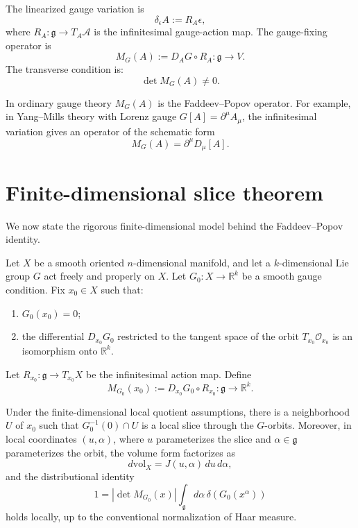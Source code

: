 \documentclass[11pt]{article}
\newcommand{\A}{\mathcal A}
\newcommand{\gh}{\mathfrak g}
\newcommand{\vol}{\mathrm{vol}}
\begin{document}
The linearized gauge variation is
\[
\delta_\epsilon A := R_A\epsilon,
\]
where \(R_A:\gh\to T_A\A\) is the infinitesimal gauge-action map. The gauge-fixing operator is
\[
M_G(A):=D_A G\circ R_A:\gh\to V.
\]
The transverse condition is:
\[
\det M_G(A)\ne0.
\]

\begin{remark}
In ordinary gauge theory \(M_G(A)\) is the Faddeev--Popov operator. For example, in Yang--Mills theory with Lorenz gauge \(G[A]=\partial^\mu A_\mu\), the infinitesimal variation gives an operator of the schematic form
\[
M_G(A)=\partial^\mu D_\mu[A].
\]
\end{remark}

\section{Finite-dimensional slice theorem}

We now state the rigorous finite-dimensional model behind the Faddeev--Popov identity.

\begin{assumption}
Let \(X\) be a smooth oriented \(n\)-dimensional manifold, and let a \(k\)-dimensional Lie group \(G\) act freely and properly on \(X\). Let \(G_0:X\to\mathbb R^k\) be a smooth gauge condition. Fix \(x_0\in X\) such that:
\begin{enumerate}
\item \(G_0(x_0)=0\);
\item the differential \(D_{x_0}G_0\) restricted to the tangent space of the orbit \(T_{x_0}\mathcal O_{x_0}\) is an isomorphism onto \(\mathbb R^k\).
\end{enumerate}
\end{assumption}

Let \(R_{x_0}:\mathfrak g\to T_{x_0}X\) be the infinitesimal action map. Define
\[
M_{G_0}(x_0):=D_{x_0}G_0\circ R_{x_0}:\mathfrak g\to\mathbb R^k.
\]

\begin{theorem}
Under the finite-dimensional local quotient assumptions, there is a neighborhood \(U\) of \(x_0\) such that \(G_0^{-1}(0)\cap U\) is a local slice through the \(G\)-orbits. Moreover, in local coordinates \((u,\alpha)\), where \(u\) parameterizes the slice and \(\alpha\in\mathfrak g\) parameterizes the orbit, the volume form factorizes as
\[
d\vol_X = J(u,\alpha)\,du\,d\alpha,
\]
and the distributional identity
\[
1
=
\left|\det M_{G_0}(x)\right|
\int_{\mathfrak g} d\alpha\,\delta(G_0(x^\alpha))
\]
holds locally, up to the conventional normalization of Haar measure.
\end{theorem}
\end{document}
